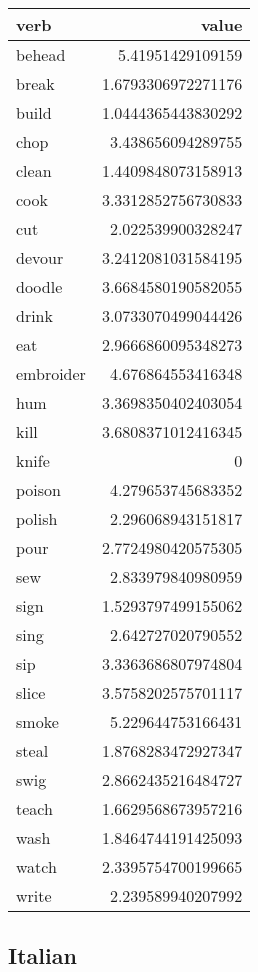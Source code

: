 \begin{longtable}{l|r}
\textbf{verb}     & \textbf{value}    \\
\hline
\endhead
behead    & 5.41951429109159   \\
break     & 1.6793306972271176 \\
build     & 1.0444365443830292 \\
chop      & 3.438656094289755  \\
clean     & 1.4409848073158913 \\
cook      & 3.3312852756730833 \\
cut       & 2.022539900328247  \\
devour    & 3.2412081031584195 \\
doodle    & 3.6684580190582055 \\
drink     & 3.0733070499044426 \\
eat       & 2.9666860095348273 \\
embroider & 4.676864553416348  \\
hum       & 3.3698350402403054 \\
kill      & 3.6808371012416345 \\
knife     & 0                  \\
poison    & 4.279653745683352  \\
polish    & 2.296068943151817  \\
pour      & 2.7724980420575305 \\
sew       & 2.833979840980959  \\
sign      & 1.5293797499155062 \\
sing      & 2.642727020790552  \\
sip       & 3.3363686807974804 \\
slice     & 3.5758202575701117 \\
smoke     & 5.229644753166431  \\
steal     & 1.8768283472927347 \\
swig      & 2.8662435216484727 \\
teach     & 1.6629568673957216 \\
wash      & 1.8464744191425093 \\
watch     & 2.3395754700199665 \\
write     & 2.239589940207992 
\end{longtable}


\subsection{Italian}

